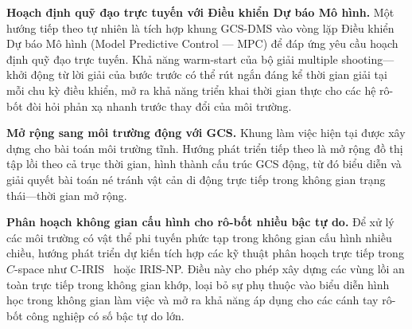 \textbf{Hoạch định quỹ đạo trực tuyến với Điều khiển Dự báo Mô hình.}
Một hướng tiếp theo tự nhiên là tích hợp khung GCS-DMS vào vòng lặp Điều
khiển Dự báo Mô hình (Model Predictive Control --- MPC) để đáp ứng yêu cầu
hoạch định quỹ đạo trực tuyến.
Khả năng warm-start của bộ giải multiple shooting---khởi động từ lời giải của
bước trước có thể rút ngắn đáng kể thời gian giải tại mỗi chu kỳ điều khiển,
mở ra khả năng triển khai thời gian thực cho các hệ rô-bốt đòi hỏi phản xạ
nhanh trước thay đổi của môi trường.

\textbf{Mở rộng sang môi trường động với GCS.}
Khung làm việc hiện tại được xây dựng cho bài toán môi trường tĩnh.
Hướng phát triển tiếp theo là mở rộng đồ thị tập lồi theo cả trục thời gian,
hình thành cấu trúc GCS động, từ đó biểu
diễn và giải quyết bài toán né tránh vật cản di động trực tiếp trong không gian
trạng thái---thời gian mở rộng.

\textbf{Phân hoạch không gian cấu hình cho rô-bốt nhiều bậc tự do.}
Để xử lý các môi trường có vật thể phi tuyến phức tạp trong không gian cấu
hình nhiều chiều, hướng phát triển dự kiến tích hợp các kỹ thuật phân hoạch
trực tiếp trong $C$-space như C-IRIS~\cite{DeitsTedrake2022CIRIS} hoặc IRIS-NP.
Điều này cho phép xây dựng các vùng lồi an toàn trực tiếp trong không gian
khớp, loại bỏ sự phụ thuộc vào biểu diễn hình học trong không gian làm việc
và mở ra khả năng áp dụng cho các cánh tay rô-bốt công nghiệp có số bậc tự do
lớn.
